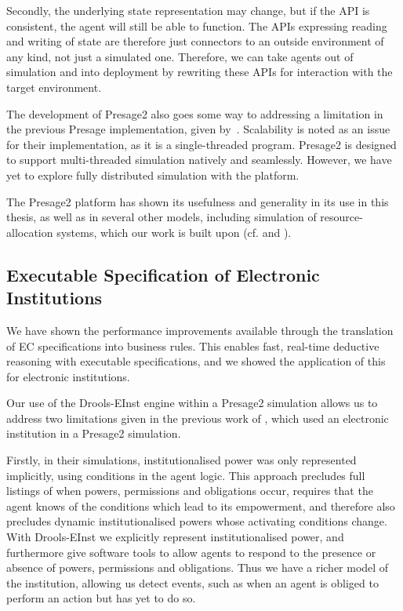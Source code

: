 Secondly, the underlying state representation may change, but if the \ac{API}
is consistent, the agent will still be able to function. The \acp{API} expressing
reading and writing of state are therefore just connectors to an outside
environment of any kind, not just a simulated one. Therefore, we can take
agents out of simulation and into deployment by rewriting these \acp{API} for
interaction with the target environment.

The development of Presage2 also goes some way to addressing a limitation in
the previous Presage implementation, given by~\citet{Neville2011}. Scalability is noted as an issue for their implementation, as it is a single-threaded
program. Presage2 is designed to support multi-threaded simulation natively
and seamlessly. However, we have yet to explore fully distributed simulation
with the platform.

The Presage2 platform has shown its usefulness and generality in its use in
this thesis, as well as in several other models, including simulation
of resource-allocation systems, which our work is built upon (cf.
\citet{Schaumeier2013} and \citet{Pitt2014}).

\subsection{Executable Specification of Electronic Institutions}

We have shown the performance improvements available through the translation
of \ac{EC} specifications into business rules. This enables fast, real-time
deductive reasoning with executable specifications, and we showed the
application of this for electronic institutions.

Our use of the Drools-EInst engine within a Presage2 simulation allows us to
address two limitations given in the previous work of \citet{Schaumeier2013},
which used an electronic institution in a Presage2 simulation.

Firstly, in their simulations, institutionalised power was only represented implicitly,
using conditions in the agent logic. This approach precludes full listings of when
powers, permissions and obligations occur, requires that the agent knows of the
conditions which lead to its empowerment, and therefore also precludes dynamic
institutionalised powers whose activating conditions change. With Drools-EInst
we explicitly represent institutionalised power, and furthermore give software
tools to allow agents to respond to the presence or absence of powers,
permissions and obligations. Thus we have a richer model of the institution,
allowing us detect events, such as when an agent is obliged to perform an
action but has yet to do so.

